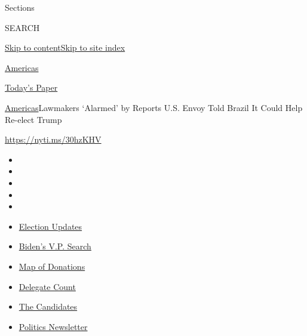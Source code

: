 Sections

SEARCH

\protect\hyperlink{site-content}{Skip to
content}\protect\hyperlink{site-index}{Skip to site index}

\href{https://www.nytimes3xbfgragh.onion/section/world/americas}{Americas}

\href{https://myaccount.nytimes3xbfgragh.onion/auth/login?response_type=cookie\&client_id=vi}{}

\href{https://www.nytimes3xbfgragh.onion/section/todayspaper}{Today's
Paper}

\href{/section/world/americas}{Americas}\textbar{}Lawmakers `Alarmed' by
Reports U.S. Envoy Told Brazil It Could Help Re-elect Trump

\url{https://nyti.ms/30hzKHV}

\begin{itemize}
\item
\item
\item
\item
\item
\end{itemize}

\begin{itemize}
\item
  \href{https://www.nytimes3xbfgragh.onion/2020/07/31/us/elections/biden-vs-trump.html?action=click\&pgtype=Article\&state=default\&region=TOP_BANNER\&context=storylines_menu}{Election
  Updates}
\item
  \href{https://www.nytimes3xbfgragh.onion/article/biden-vice-president-2020.html?action=click\&pgtype=Article\&state=default\&region=TOP_BANNER\&context=storylines_menu}{Biden's
  V.P. Search}
\item
  \href{https://www.nytimes3xbfgragh.onion/interactive/2020/07/24/us/politics/trump-biden-campaign-donors.html?action=click\&pgtype=Article\&state=default\&region=TOP_BANNER\&context=storylines_menu}{Map
  of Donations}
\item
  \href{https://www.nytimes3xbfgragh.onion/interactive/2020/us/elections/delegate-count-primary-results.html?action=click\&pgtype=Article\&state=default\&region=TOP_BANNER\&context=storylines_menu}{Delegate
  Count}
\item
  \href{https://www.nytimes3xbfgragh.onion/interactive/2019/us/politics/2020-presidential-candidates.html?action=click\&pgtype=Article\&state=default\&region=TOP_BANNER\&context=storylines_menu}{The
  Candidates}
\item
  \href{https://www.nytimes3xbfgragh.onion/newsletters/politics?action=click\&pgtype=Article\&state=default\&region=TOP_BANNER\&context=storylines_menu}{Politics
  Newsletter}
\end{itemize}

